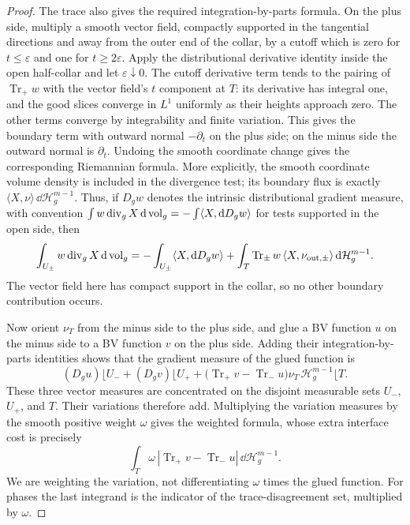 \begin{proof}
The trace also gives the required integration-by-parts formula.
On the plus side, multiply a smooth vector field, compactly supported
in the tangential directions and away from the outer end of the
collar, by a cutoff which is zero for $t\le\varepsilon$ and one for
$t\ge2\varepsilon$.
Apply the distributional derivative identity inside the open
half-collar and let $\varepsilon\downarrow0$.
The cutoff derivative term tends to the pairing of
$\operatorname{Tr}_+w$ with the vector field's $t$ component at $T$:
its derivative has integral one, and the good slices converge in
$L^1$ uniformly as their heights approach zero.
The other terms converge by integrability and finite variation.
This gives the boundary term with outward normal $-\partial_t$ on
the plus side; on the minus side the outward normal is $\partial_t$.
Undoing the smooth coordinate change gives the corresponding
Riemannian formula.  More explicitly, the smooth coordinate volume
density is included in the divergence test; its boundary flux is
exactly $\langle X,\nu\rangle\,\dd\mathcal H_g^{m-1}$.
Thus, if $D_g w$ denotes the intrinsic distributional gradient measure,
with convention
$\int w\operatorname{div}_g X\,\mathrm d\operatorname{vol}_g=-\int\langle X,\mathrm d D_g w\rangle$
for tests supported in the open side, then
\[
 \int_{U_\pm}w\operatorname{div}_g X\,\mathrm d\operatorname{vol}_g
 =-\int_{U_\pm}\langle X,\mathrm d D_g w\rangle
   +\int_T\operatorname{Tr}_\pm w\,
                   \langle X,\nu_{\mathrm{out},\pm}\rangle
                         \,\mathrm d\mathcal H_g^{m-1}.
\]
The vector field here has compact support in the collar, so no other
boundary contribution occurs.

Now orient $\nu_T$ from the minus side to the plus side, and glue a BV
function $u$ on the minus side to a BV function $v$ on the plus side.
Adding their integration-by-parts identities shows that the gradient
measure of the glued function is
\[
 (D_g u)\lfloor U_-+(D_g v)\lfloor U_+
 +\bigl(\operatorname{Tr}_+v-\operatorname{Tr}_-u\bigr)
                  \nu_T\,\mathcal H_g^{m-1}\lfloor T.
\]
These three vector measures are concentrated on the disjoint
measurable sets $U_-$, $U_+$, and $T$.  Their variations therefore
add.  Multiplying the variation measures by the smooth positive
weight $\omega$ gives the weighted formula, whose extra interface
cost is precisely
\[
 \int_T\omega\,
       |\operatorname{Tr}_+v-\operatorname{Tr}_-u|
                         \,\dd\mathcal H_g^{m-1}.
\]
We are weighting the variation, not differentiating $\omega$ times
the glued function.  For phases the last integrand is the indicator
of the trace-disagreement set, multiplied by $\omega$.


\end{proof}
